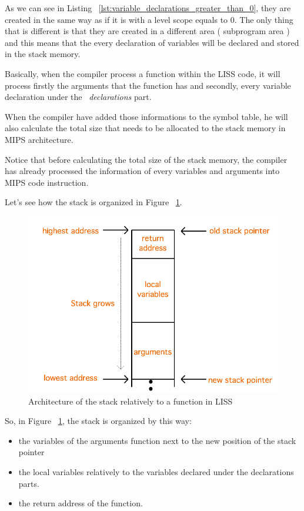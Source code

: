 \documentclass[
  oneside,
  11pt, a4paper,
  footinclude=true,
  headinclude=true,
  cleardoublepage=empty
]{scrbook}
\begin{document}
As we can see in Listing ~\ref{lst:variable_declarations_greater_than_0}, they are created in the same way as if it is with a level scope equals to 0. The only thing that is different is that they are created in a different area ( subprogram area ) and this means that the every declaration of variables will be declared and stored in the stack memory.

Basically, when the compiler process a function within the LISS code, it will process firstly the arguments that the function has and secondly, every variable declaration under the ~\textit{declarations} part.

When the compiler have added those informations to the symbol table, he will also calculate the total size that needs to be allocated to the stack memory in MIPS architecture.

Notice that before calculating the total size of the stack memory, the compiler has already processed the information of every variables and arguments into MIPS code instruction.

Let's see how the stack is organized in Figure ~\ref{fig:stack_architecture_mips}.

\begin{figure}[h!]
  \centering
    \includegraphics[width=1\textwidth]{img/stack_architecture.png}
    \caption{Architecture of the stack relatively to a function in LISS}
    \label{fig:stack_architecture_mips}
\end{figure}

So, in Figure ~\ref{fig:stack_architecture_mips}, the stack is organized by this way: 
\begin{itemize}
\item the variables of the arguments function next to the new position of the stack pointer
\item the local variables relatively to the variables declared under the declarations parts.
\item the return address of the function.
\end{itemize}
\end{document}
